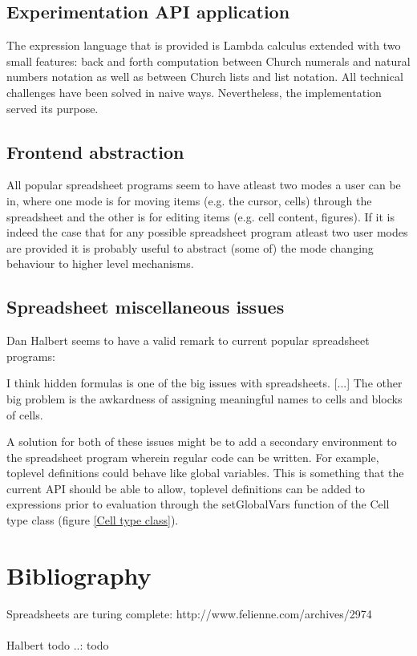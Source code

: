 \documentclass[10pt,a4paper]{article}
\begin{document}
\subsection{Experimentation API application}
\label{Experimentation API application}
The expression language that is provided is Lambda calculus extended with two small features: back and forth
computation between Church numerals and natural numbers notation as well as between Church lists
and list notation. All technical challenges have been solved in naive ways. Nevertheless, the
implementation served its purpose.

\subsection{Frontend abstraction}
\label{Frontend abstraction}
All popular spreadsheet programs seem to have atleast two modes a user can be in,
where one mode is for moving items (e.g. the cursor, cells) through the spreadsheet and the other
is for editing items (e.g. cell content, figures).
If it is indeed the case that for any possible spreadsheet program atleast two user modes are
provided it is probably useful to abstract (some of) the mode changing behaviour to higher level
mechanisms.

\subsection{Spreadsheet miscellaneous issues}
\label{Spreadsheet miscellaneous issues}
Dan Halbert seems to have a valid remark to current popular spreadsheet programs:
\begin{displayquote}
I think hidden formulas is one of the big issues with spreadsheets. [...] The other big problem
is the awkardness of assigning meaningful names to cells and blocks of cells.
\end{displayquote}
A solution for both of these issues might be to add a secondary environment to the spreadsheet program
wherein regular code can be written. For example, toplevel definitions could behave like global
variables. This is something that the current API should be able to allow, toplevel definitions
can be added to expressions prior to evaluation through the setGlobalVars function of the
Cell type class (figure \ref{Cell type class}).




\section*{Bibliography}
Spreadsheets are turing complete: http://www.felienne.com/archives/2974
\\\\
Halbert todo ..: todo
\end{document}
